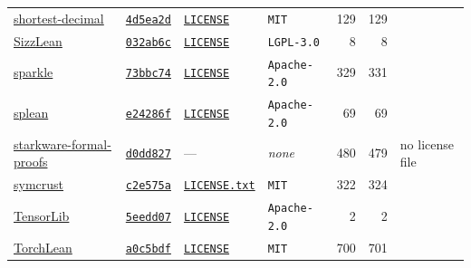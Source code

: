 \documentclass{article}
\begin{document}
\begin{table}[p]
\begin{tabular}{lllp{2.9cm}rrl}
    \href{https://github.com/lexicone42/shortest-decimal}{shortest-decimal} & \href{https://github.com/lexicone42/shortest-decimal/tree/4d5ea2d583f5fae86413317b4b01ebc4c4c91e4b}{\texttt{4d5ea2d}} & \href{https://github.com/lexicone42/shortest-decimal/blob/4d5ea2d583f5fae86413317b4b01ebc4c4c91e4b/LICENSE}{\texttt{LICENSE}} & \texttt{MIT} & 129 & 129 &  \\
    \href{https://github.com/etheorem/etheorem}{SizzLean} & \href{https://github.com/etheorem/etheorem/tree/032ab6c6d67186ba60b734e0f2c44ba1bb8b6fb0}{\texttt{032ab6c}} & \href{https://github.com/etheorem/etheorem/blob/032ab6c6d67186ba60b734e0f2c44ba1bb8b6fb0/LICENSE}{\texttt{LICENSE}} & \texttt{LGPL-3.0} & 8 & 8 &  \\
    \href{https://github.com/Verilean/sparkle}{sparkle} & \href{https://github.com/Verilean/sparkle/tree/73bbc74ac3244ea44b7846c212dbfd42786eff27}{\texttt{73bbc74}} & \href{https://github.com/Verilean/sparkle/blob/73bbc74ac3244ea44b7846c212dbfd42786eff27/LICENSE}{\texttt{LICENSE}} & \texttt{Apache-2.0} & 329 & 331 &  \\
    \href{https://github.com/verse-lab/splean}{splean} & \href{https://github.com/verse-lab/splean/tree/e24286f51bd9ee207197d47ec587d592cdfb0ddc}{\texttt{e24286f}} & \href{https://github.com/verse-lab/splean/blob/e24286f51bd9ee207197d47ec587d592cdfb0ddc/LICENSE}{\texttt{LICENSE}} & \texttt{Apache-2.0} & 69 & 69 &  \\
    \href{https://github.com/starkware-libs/formal-proofs}{starkware-formal-proofs} & \href{https://github.com/starkware-libs/formal-proofs/tree/d0dd8279612a248cbc6bf6d286030bf0bb2a37ff}{\texttt{d0dd827}} & --- & \emph{none} & 480 & 479 & no license file \\
    \href{https://github.com/microsoft/SymCrypt}{symcrust} & \href{https://github.com/microsoft/SymCrypt/tree/c2e575ace0ea4b6b7a4184c1f19b81d1d5b2b5be}{\texttt{c2e575a}} & \href{https://github.com/microsoft/SymCrypt/blob/c2e575ace0ea4b6b7a4184c1f19b81d1d5b2b5be/LICENSE.txt}{\texttt{LICENSE.txt}} & \texttt{MIT} & 322 & 324 &  \\
    \href{https://github.com/leanprover/TensorLib}{TensorLib} & \href{https://github.com/leanprover/TensorLib/tree/5eedd07b028057a317ae2fffbe48d6781bb34aff}{\texttt{5eedd07}} & \href{https://github.com/leanprover/TensorLib/blob/5eedd07b028057a317ae2fffbe48d6781bb34aff/LICENSE}{\texttt{LICENSE}} & \texttt{Apache-2.0} & 2 & 2 &  \\
    \href{https://github.com/lean-dojo/TorchLean}{TorchLean} & \href{https://github.com/lean-dojo/TorchLean/tree/a0c5bdf2bb02c25b270a2c89a12ad2335c86c530}{\texttt{a0c5bdf}} & \href{https://github.com/lean-dojo/TorchLean/blob/a0c5bdf2bb02c25b270a2c89a12ad2335c86c530/LICENSE}{\texttt{LICENSE}} & \texttt{MIT} & 700 & 701 &  \\

\end{tabular}
\end{table}
\end{document}
